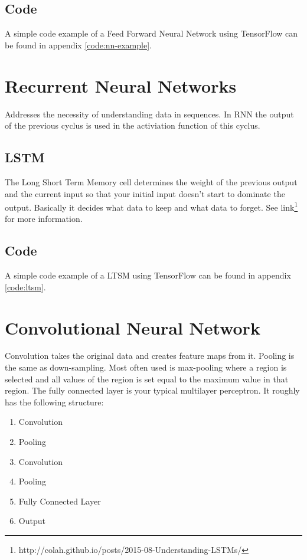 \subsection{Code}
A simple code example of a Feed Forward Neural Network using TensorFlow can be found in appendix \ref{code:nn-example}. 

\section{Recurrent Neural Networks}
Addresses the necessity of understanding data in sequences. In RNN the output of the previous cyclus is used in the activiation function of this cyclus.

\subsection{LSTM}
The Long Short Term Memory cell determines the weight of the previous output and the current input so that your initial input doesn't start to dominate the output. Basically it decides what data to keep and what data to forget.
See link\footnote{http://colah.github.io/posts/2015-08-Understanding-LSTMs/} for more information.

\subsection{Code}
A simple code example of a LTSM using TensorFlow can be found in appendix \ref{code:ltsm}. 

\section{Convolutional Neural Network}
Convolution takes the original data and creates feature maps from it. Pooling is the same as down-sampling. Most often used is max-pooling where a region is selected and all values of the region is set equal to the maximum value in that region. The fully connected layer is your typical multilayer perceptron. It roughly has the following structure:
\begin{enumerate}
\item Convolution
\item Pooling
\item Convolution
\item Pooling
\item Fully Connected Layer
\item Output
\end{enumerate}

